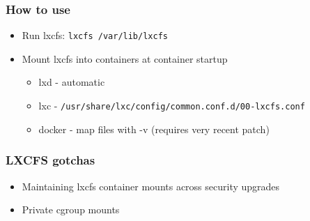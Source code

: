 \documentclass{beamer}
\begin{document}
\lstset{language=bash}

\begin{frame}
\frametitle{How to use}
\begin{itemize}
\item Run lxcfs: {\tt lxcfs /var/lib/lxcfs}

\item Mount lxcfs into containers at container startup
	\begin{itemize}
	\item lxd - automatic
	\item lxc - {\tt /usr/share/lxc/config/common.conf.d/00-lxcfs.conf}
	\item docker - map files with -v (requires very recent patch)
	\end{itemize}
\end{itemize}

\newpage

{\tiny

}
\end{frame}

\begin{frame}
\frametitle{LXCFS gotchas}
	\begin{itemize}
	\item Maintaining lxcfs container mounts across security upgrades
	\item Private cgroup mounts
	\end{itemize}
\end{frame}

\end{document}
